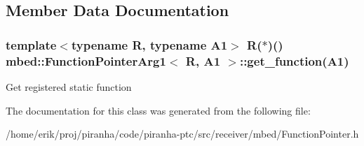 \subsection{Member Data Documentation}
\subsubsection[{\texorpdfstring{get\+\_\+function}{get_function}}]{\setlength{\rightskip}{0pt plus 5cm}template$<$typename R, typename A1$>$ R($\ast$)() {\bf mbed\+::\+Function\+Pointer\+Arg1}$<$ R, A1 $>$\+::get\+\_\+function(A1)\hspace{0.3cm}{\ttfamily [inline]}}\hypertarget{classmbed_1_1FunctionPointerArg1_a8dfc6095837c03196cf8027faf680c25}{}\label{classmbed_1_1FunctionPointerArg1_a8dfc6095837c03196cf8027faf680c25}
Get registered static function 

The documentation for this class was generated from the following file\+:\begin{DoxyCompactItemize}
\item 
/home/erik/proj/piranha/code/piranha-\/ptc/src/receiver/mbed/Function\+Pointer.\+h\end{DoxyCompactItemize}
